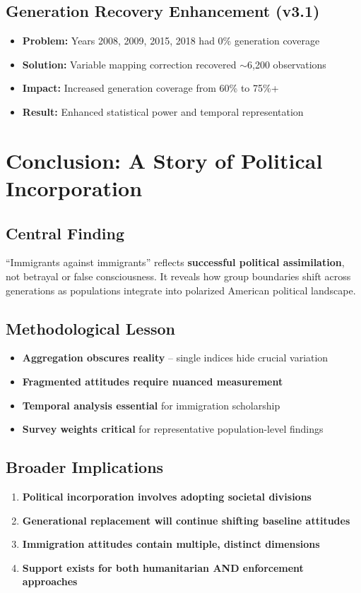 \documentclass[11pt,letterpaper]{article}
\begin{document}
\subsection{Generation Recovery Enhancement (v3.1)}
\begin{itemize}
    \item \textbf{Problem:} Years 2008, 2009, 2015, 2018 had 0\% generation coverage
    \item \textbf{Solution:} Variable mapping correction recovered $\sim$6,200 observations
    \item \textbf{Impact:} Increased generation coverage from 60\% to 75\%+
    \item \textbf{Result:} Enhanced statistical power and temporal representation
\end{itemize}

\section{Conclusion: A Story of Political Incorporation}

\subsection{Central Finding}

``Immigrants against immigrants'' reflects \textbf{successful political assimilation}, not betrayal or false consciousness. It reveals how group boundaries shift across generations as populations integrate into polarized American political landscape.

\subsection{Methodological Lesson}
\begin{itemize}
    \item \textbf{Aggregation obscures reality} -- single indices hide crucial variation
    \item \textbf{Fragmented attitudes require nuanced measurement}
    \item \textbf{Temporal analysis essential} for immigration scholarship
    \item \textbf{Survey weights critical} for representative population-level findings
\end{itemize}

\subsection{Broader Implications}
\begin{enumerate}
    \item \textbf{Political incorporation involves adopting societal divisions}
    \item \textbf{Generational replacement will continue shifting baseline attitudes}
    \item \textbf{Immigration attitudes contain multiple, distinct dimensions}
    \item \textbf{Support exists for both humanitarian AND enforcement approaches}
\end{enumerate}
\end{document}
